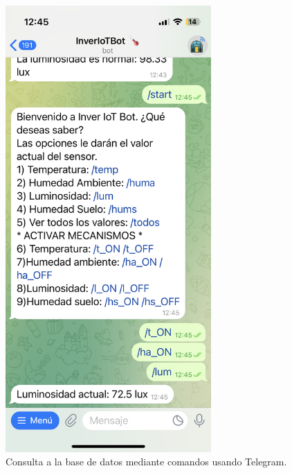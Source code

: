 \begin{figure}[h]
	\centering
	\includegraphics[width=0.7\textwidth]{img/desarrollo/BotTelegram_comandos.png}
	\caption{Consulta a la base de datos mediante comandos usando Telegram.}
\end{figure}
